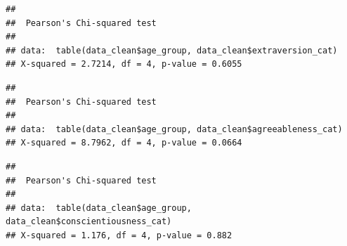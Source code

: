 \documentclass[
]{article}
\newenvironment{Shaded}{\begin{snugshade}}{\end{snugshade}}
\newcommand{\FunctionTok}[1]{\textcolor[rgb]{0.13,0.29,0.53}{\textbf{#1}}}
\newcommand{\NormalTok}[1]{#1}
\newcommand{\SpecialCharTok}[1]{\textcolor[rgb]{0.81,0.36,0.00}{\textbf{#1}}}
\begin{document}
\begin{Shaded}
\end{Shaded}

\begin{verbatim}
## 
##  Pearson's Chi-squared test
## 
## data:  table(data_clean$age_group, data_clean$extraversion_cat)
## X-squared = 2.7214, df = 4, p-value = 0.6055
\end{verbatim}

\begin{Shaded}
\end{Shaded}

\begin{verbatim}
## 
##  Pearson's Chi-squared test
## 
## data:  table(data_clean$age_group, data_clean$agreeableness_cat)
## X-squared = 8.7962, df = 4, p-value = 0.0664
\end{verbatim}

\begin{Shaded}
\end{Shaded}

\begin{verbatim}
## 
##  Pearson's Chi-squared test
## 
## data:  table(data_clean$age_group, data_clean$conscientiousness_cat)
## X-squared = 1.176, df = 4, p-value = 0.882
\end{verbatim}

\begin{Shaded}
\end{Shaded}
\end{document}
